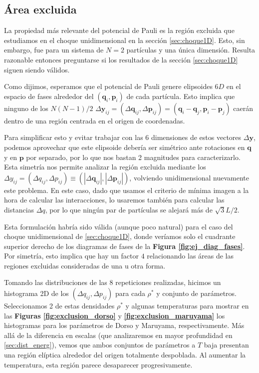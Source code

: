 \subsection{Área excluida}{\label{sec:area_exc}}

La propiedad más relevante del potencial de Pauli es la región excluida que estudiamos en el choque unidimensional en la sección \ref{sec:choque1D}.
Esto, sin embargo, fue para un sistema de $N=2$ partículas y una única dimensión.
Resulta razonable entonces preguntarse si los resultados de la sección \ref{sec:choque1D} siguen siendo válidos.

Como dijimos, esperamos que el potencial de Pauli genere elipsoides $6D$ en el espacio de fases alrededor del $(\mathbf{q}_i,\mathbf{p}_i)$ de cada partícula.
Esto implica que ninguno de los $N(N-1)/2$ $\Delta \mathbf{y}_{ij} = (\Delta \mathbf{q}_{ij}, \Delta \mathbf{p}_{ij}) = (\mathbf{q}_i-\mathbf{q}_j,\mathbf{p}_i-\mathbf{p}_j)$ caerán dentro
de una región centrada en el origen de coordenadas.

Para simplificar esto y evitar trabajar con las 6 dimensiones de estos vectores $\Delta \mathbf{y}$, podemos aprovechar que este elipsoide debería ser simétrico ante rotaciones en $\mathbf{q}$
y en $\mathbf{p}$ por separado, por lo que nos bastan 2 magnitudes para caracterizarlo.
Esta simetría nos permite analizar la región excluida mediante los $\Delta y_{ij} = (\Delta q_{ij},\Delta p_{ij}) \equiv (|\Delta \mathbf{q}_{ij}|, |\Delta \mathbf{p}_{ij}|)$, volviendo
unidimensional nuevamente este problema.
En este caso, dado que usamos el criterio de mínima imagen a la hora de calcular las interacciones, lo usaremos también para calcular las distancias $\Delta q$, por lo que ningún
par de partículas se alejará más de $\sqrt{3}L/2$.

Esta formulación habría sido válida (aunque poco natural) para el caso del choque unidimensional de \ref{sec:choque1D}, donde veríamos solo el cuadrante superior derecho de los diagramas de
fases de la \textbf{Figura \ref{fig:ej_diag_fases}}.
Por simetría, esto implica que hay un factor $4$ relacionando las áreas de las regiones excluidas consideradas de una u otra forma.

Tomando las distribuciones de las 8 repeticiones realizadas, hicimos un histograma 2D de los $(\Delta q_{ij},\Delta p_{ij})$ para cada $\rho^*$ y conjunto de parámetros.
Seleccionamos 2 de estas densidades $\rho^*$ y algunas temperaturas para mostrar en las \textbf{Figuras \ref{fig:exclusion_dorso}} y \textbf{\ref{fig:exclusion_maruyama}} los histogramas
para los parámetros de Dorso y Maruyama, respectivamente.
Más allá de la diferencia en escalas (que analizaremos en mayor profundidad en \ref{sec:dist_energ}), vemos que ambos conjuntos de parámetros a $T$ baja presentan una región elíptica alrededor
del origen totalmente despoblada.
Al aumentar la temperatura, esta región parece desaparecer progresivamente.

